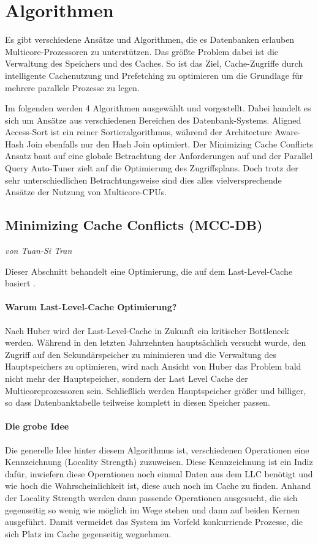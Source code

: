 \chapter{Algorithmen}
\label{sec:Algorithmen}
Es gibt verschiedene Ansätze und Algorithmen, die es Datenbanken erlauben Multicore-Prozessoren zu unterstützen. Das größte Problem dabei ist die Verwaltung des Speichers und des Caches. So ist das Ziel, Cache-Zugriffe durch intelligente Cachenutzung und Prefetching zu optimieren um die Grundlage für mehrere parallele Prozesse zu legen.

Im folgenden werden 4 Algorithmen ausgewählt und vorgestellt. Dabei handelt es sich um Ansätze aus verschiedenen Bereichen des Datenbank-Systems. Aligned Access-Sort ist ein reiner Sortieralgorithmus, während der Architecture Aware-Hash Join ebenfalls nur den Hash Join optimiert. Der Minimizing Cache Conflicts Ansatz baut auf eine globale Betrachtung der Anforderungen auf und der Parallel Query Auto-Tuner zielt auf die Optimierung des Zugriffsplans. Doch trotz der sehr unterschiedlichen Betrachtungsweise sind dies alles vielversprechende Ansätze der Nutzung von Multicore-CPUs.


\section{Minimizing Cache Conflicts (MCC-DB)}
\label{sec:MCC-DB}
\textit{von Tuan-Si Tran}

Dieser Abschnitt behandelt eine Optimierung, die auf dem Last-Level-Cache basiert \cite{LEE}. 

\subsubsection*{Warum Last-Level-Cache Optimierung?}
Nach Huber \cite{HUBER} wird der Last-Level-Cache in Zukunft ein kritischer Bottleneck werden. Während in den letzten Jahrzehnten hauptsächlich versucht wurde, den Zugriff auf den Sekundärspeicher zu minimieren und die Verwaltung des Hauptspeichers zu optimieren, wird nach Ansicht von Huber das Problem bald nicht mehr der Hauptspeicher, sondern der Last Level Cache der Multicoreprozessoren sein. Schließlich werden Hauptspeicher größer und billiger, so dass Datenbanktabelle teilweise komplett in diesen Speicher passen.

\subsubsection*{Die grobe Idee}
Die generelle Idee hinter diesem Algorithmus ist, verschiedenen Operationen eine Kennzeichnung (Locality Strength) zuzuweisen. Diese Kennzeichnung ist ein Indiz dafür, inwiefern diese Operationen noch einmal Daten aus dem LLC benötigt und wie hoch die Wahrscheinlichkeit ist, diese auch noch im Cache zu finden. Anhand der Locality Strength werden dann passende Operationen ausgesucht, die sich gegenseitig so wenig wie möglich im Wege stehen und dann auf beiden Kernen ausgeführt. Damit vermeidet das System im Vorfeld konkurriende Prozesse, die sich Platz im Cache gegenseitig wegnehmen.

